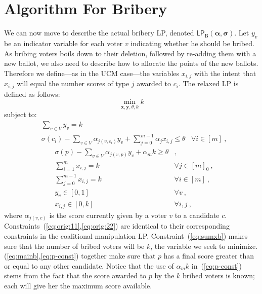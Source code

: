 \documentclass[letterpaper]{article} %
\theoremstyle{definition}
\newcommand\vecc{\mathbf}
\newcommand\vecgreek{\bm}
\newcommand{\veca}{\vecgreek{\alpha}}
\newcommand{\vecs}{\vecgreek{\sigma}}
\newcommand{\LPB}{\mathsf{LP}_{\mathrm{B}}}
\begin{document}
\section{Algorithm For Bribery}
We can now move to describe the actual bribery LP, denoted $\LPB(\veca,\vecs)$. Let $y_v$  be an indicator variable for  each voter $v$ indicating whether he should be bribed. As bribing voters boils down to their deletion, followed by re-adding them with a new ballot, we also need to describe how to allocate the points of the new ballots. Therefore we define---as in the UCM case---the variables $x_{i,j}$ with the intent that $x_{i,j}$ will equal the number scores of type $j$ awarded to $c_i$.  The  relaxed LP is defined as follows:
\begin{equation*}
\min_{\vecc{x}, \vecc{y}, \theta,k} k
\end{equation*}
subject to:
\begin{align}
&\sum_{v \in V}y_v = k &\label{eq:sumxb}\\
&\sigma(c_i) - \sum_{v \in V}\alpha_{j(v,c_i)} y_{v} + \sum_{j=0}^{m-1} \alpha_j x_{i,j}\leq \theta &\forall i\in[m]\label{eq:mainb}\ ,
\end{align}
\begin{align}
&\sigma(p) - \sum_{v \in V}\alpha_{j(v,p)} y_{v} + \alpha_m k \geq \theta &, \label{eq:p-const}\\
&\sum_{i=1}^m x_{i,j}=k &\forall j\in[m]_0\label{eq:orig:11}\ ,\\
&\sum_{j=0}^{m-1}x_{i,j}=k &\forall i\in[m]\label{eq:orig:22}\ ,\\
&y_{v} \in [0,1] & \forall v\ ,\\
&x_{i,j} \in [0,k] & \forall i,j\ ,
\end{align}
where $\alpha_{j(v,c)}$ is the score currently given by a voter $v$ to a candidate $c$. Constraints~(\ref{eq:orig:11},\ref{eq:orig:22}) are identical to their corresponding constraints in the coalitional manipulation LP.
Constraint~(\ref{eq:sumxb}) makes sure that the number of bribed voters will be $k$, the variable we seek to minimize.
(\ref{eq:mainb},\ref{eq:p-const}) together make sure that $p$ has a final score greater than or equal to any other candidate.
Notice that the use of $\alpha_m k$ in~(\ref{eq:p-const})  stems from the fact that the score awarded to $p$ by the $k$ bribed voters is known; each will give her the maximum score available.
\end{document}
